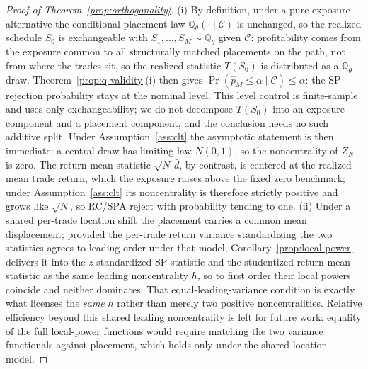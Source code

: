 \documentclass[preprint,12pt]{elsarticle}
\theoremstyle{definition}
\begin{document}
\begin{proof}[Proof of Theorem~\ref{prop:orthogonality}]
(i) By definition, under a pure-exposure alternative the conditional placement law
$\mathbb{Q}_\theta(\cdot\mid\mathcal C)$ is unchanged, so the realized schedule
$S_0$ is exchangeable with $S_1,\dots,S_M\sim\mathbb{Q}_\theta$ given $\mathcal C$:
profitability comes from the exposure common to all structurally matched
placements on the path, not from where the trades sit, so the realized statistic
$T(S_0)$ is distributed as a $\mathbb{Q}_\theta$-draw.
Theorem~\ref{prop:q-validity}(i) then gives
$\Pr(\hat p_M\le\alpha\mid\mathcal C)\le\alpha$: the SP rejection probability stays
at the nominal level. This level control is finite-sample and uses only
exchangeability; we do not decompose $T(S_0)$ into an exposure component and a
placement component, and the conclusion needs no such additive split. Under
Assumption~\ref{ass:clt} the asymptotic statement is then immediate: a central draw
has limiting law $N(0,1)$, so the noncentrality of $Z_N$ is zero. The return-mean
statistic $\sqrt N\,\bar d$, by contrast, is centered at the realized mean trade
return, which the exposure raises above the fixed zero benchmark; under
Assumption~\ref{ass:clt} its noncentrality is therefore strictly positive and grows
like $\sqrt N$, so RC/SPA reject with probability tending to one. (ii) Under a
shared per-trade location shift the placement carries a common mean displacement;
provided the per-trade return variance standardizing the two statistics agrees to
leading order under that model, Corollary~\ref{prop:local-power} delivers it into
the $z$-standardized SP statistic and the studentized return-mean statistic as the
same leading noncentrality $h$, so to first order their local powers coincide and
neither dominates. That equal-leading-variance condition is exactly what licenses
the \emph{same} $h$ rather than merely two positive noncentralities. Relative
efficiency beyond this shared leading noncentrality is left for future work:
equality of the full local-power functions would require matching the two variance
functionals against placement, which holds only under the shared-location model.
\end{proof}
\end{document}
